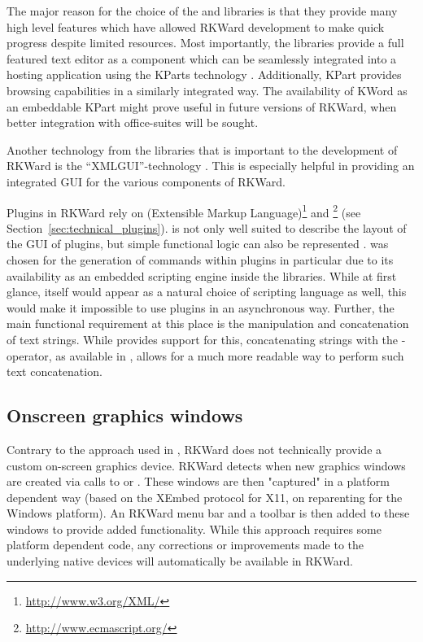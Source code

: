The major reason for the choice of the  and  libraries is that they provide
many high level features which have allowed RKWard development to make quick
progress despite limited resources. Most importantly, the  libraries provide a
full featured text editor \citep{CullmannND} as a component which can be
seamlessly integrated into a hosting application using the KParts technology
\citep{Faure2000}. Additionally, KPart provides  browsing capabilities in a
similarly integrated way. The availability of KWord \citep{KWord} as an
embeddable KPart might prove useful in future versions of RKWard, when better
integration with office-suites will be sought.

Another technology from the  libraries that is important to the development
of RKWard is the ``XMLGUI''-technology
\citep{Faure2000}. This is especially helpful in providing an integrated GUI for
the various components of RKWard.

Plugins in RKWard rely on  (Extensible Markup Language)\footnote{\url{http://www.w3.org/XML/}}
and \footnote{\url{http://www.ecmascript.org/}} (see Section~\ref{sec:technical_plugins}).  is not
only well suited to describe the layout of the GUI of plugins, but simple
functional logic can also be represented \citep{Visne2009}.  was
chosen for the generation of  commands within plugins in particular due to its
availability as an embedded scripting engine inside the  libraries. While at
first glance,  itself would appear as a natural choice of scripting language as
well, this would make it impossible to use plugins in an asynchronous way.
Further, the main functional requirement at this place is the manipulation and
concatenation of text strings. While  provides support for this, concatenating
strings with the \code{+}-operator, as available in , allows for a much
more readable way to perform such text concatenation.

\subsection{Onscreen graphics windows}
\label{sec:technical_graphics}
Contrary to the approach used in  \citep{HelbigTheus2005}, RKWard does
not technically provide a custom on-screen graphics device. RKWard detects when
new graphics windows are created via calls to  or . These windows
are then "captured" in a platform dependent way (based on the XEmbed \citep{Ettrich2002} protocol
for X11, on reparenting for the Windows platform). An RKWard menu bar and a
toolbar is then added to these windows to provide added functionality. While
this approach requires some platform dependent code, any corrections or
improvements made to the underlying  native devices will automatically be
available in RKWard.


